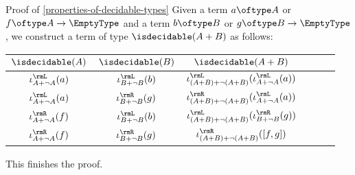 \begin{Proof}{Proof of \cref{properties-of-decidable-types}}%
    Given a term $a\oftype A$ or $f\oftype A\to\EmptyType$ and a term $b\oftype B$ or $g\oftype B\to\EmptyType$, we construct a term of type $\isdecidable(A+B)$ as follows:
    \begingroup%
    \renewcommand{\arraystretch}{1.2}
    \begin{center}
        \begin{tabular}{|Sc|Sc|Sc|}\hline{}
            $\isdecidable(A)$            & $\isdecidable(B)$            & $\isdecidable(A+B)$                                          \\\hline{}
            $\iota^{\rmL}_{A+\neg A}(a)$ & $\iota^{\rmL}_{B+\neg B}(b)$ & $\iota^{\rmL}_{(A+B)+\neg(A+B)}(\iota^{\rmL}_{A+\neg A}(a))$ \\
            $\iota^{\rmL}_{A+\neg A}(a)$ & $\iota^{\rmR}_{B+\neg B}(g)$ & $\iota^{\rmR}_{(A+B)+\neg(A+B)}(\iota^{\rmL}_{A+\neg A}(a))$ \\
            $\iota^{\rmR}_{A+\neg A}(f)$ & $\iota^{\rmL}_{B+\neg B}(b)$ & $\iota^{\rmL}_{(A+B)+\neg(A+B)}(\iota^{\rmR}_{B+\neg B}(g))$ \\
            $\iota^{\rmR}_{A+\neg A}(f)$ & $\iota^{\rmR}_{B+\neg B}(g)$ & $\iota^{\rmR}_{(A+B)+\neg(A+B)}([f,g])$                      \\\hline
        \end{tabular}
    \end{center}
    \endgroup
    This finishes the proof.


\end{Proof}
